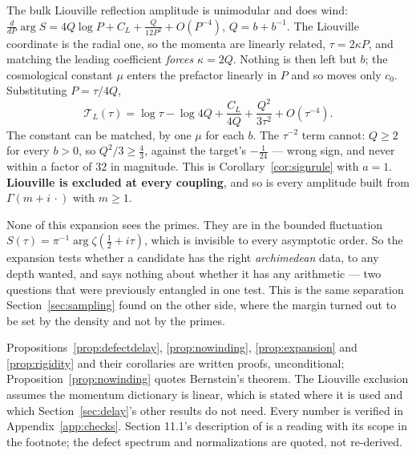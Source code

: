 The bulk Liouville reflection amplitude is unimodular and does wind:
$\frac{d}{dP}\arg S=4Q\log P+C_L+\frac{Q}{12P^2}+O(P^{-4})$, $Q=b+b^{-1}$.
The Liouville coordinate is the radial one, so the momenta are linearly related,
$\tau=2\kappa P$, and matching the leading coefficient \emph{forces} $\kappa=2Q$.
Nothing is then left but $b$; the cosmological constant $\mu$ enters the
prefactor linearly in $P$ and so moves only $c_0$. Substituting $P=\tau/4Q$,
\[
 \mathcal T_L(\tau)=\log\tau-\log4Q+\frac{C_L}{4Q}+\frac{Q^2}{3\tau^2}+O(\tau^{-4}) .
\]
The constant can be matched, by one $\mu$ for each $b$. The $\tau^{-2}$ term
cannot: $Q\geq2$ for every $b>0$, so $Q^2/3\geq\frac43$, against the target's
$-\frac1{24}$ --- wrong sign, and never within a factor of $32$ in magnitude.
This is Corollary~\ref{cor:signrule} with $a=1$. \textbf{Liouville is excluded at
every coupling}, and so is every amplitude built from $\Gamma(m+i\,\cdot)$ with
$m\geq1$.

\begin{remark}\label{rem:notprimes}
None of this expansion sees the primes. They are in the bounded fluctuation
$S(\tau)=\pi^{-1}\arg\zeta(\frac12+i\tau)$, which is invisible to every
asymptotic order. So the expansion tests whether a candidate has the right
\emph{archimedean} data, to any depth wanted, and says nothing about whether it
has any arithmetic --- two questions that were previously entangled in one test.
This is the same separation Section~\ref{sec:sampling} found on the other side,
where the margin turned out to be set by the density and not by the primes.
\end{remark}

\begin{remark}\label{rem:delaystatus}
Propositions~\ref{prop:defectdelay}, \ref{prop:nowinding}, \ref{prop:expansion}
and \ref{prop:rigidity} and their corollaries are written proofs, unconditional;
Proposition~\ref{prop:nowinding} quotes Bernstein's theorem. The Liouville
exclusion assumes the momentum dictionary is linear, which is stated where it is
used and which Section~\ref{sec:delay}'s other results do not need. Every number
is verified in Appendix~\ref{app:checks}. Section 11.1's description of
\cite{OWL} is a reading with its scope in the footnote; the defect spectrum and
normalizations are quoted, not re-derived.
\end{remark}
